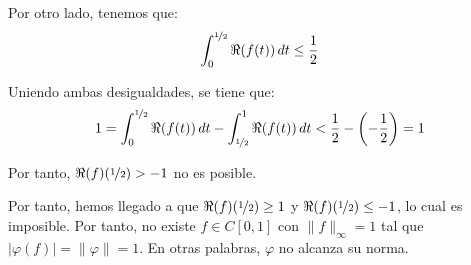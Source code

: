 \documentclass[12pt]{article}
\begin{document}
\begin{ejercicio}
\begin{description}
\begin{itemize}
                Por otro lado, tenemos que:
                \begin{equation*}
                    \int_0^{\nicefrac{1}{2}} \Re(f(t))\,dt \leq \frac{1}{2}
                \end{equation*}

                Uniendo ambas desigualdades, se tiene que:
                \begin{equation*}
                    1 = \int_0^{\nicefrac{1}{2}} \Re(f(t))\,dt - \int_{\nicefrac{1}{2}}^1 \Re(f(t))\,dt < \frac{1}{2} - \left(-\frac{1}{2}\right) = 1
                \end{equation*}

                Por tanto, $\Re(f)(\nicefrac{1}{2}) > -1$ no es posible.
            \end{itemize}

            Por tanto, hemos llegado a que $\Re(f)(\nicefrac{1}{2})\geq 1$ y $\Re(f)(\nicefrac{1}{2})\leq -1$, lo cual es imposible. Por tanto, no existe $f \in C[0, 1]$ con $\|f\|_\infty = 1$ tal que $|\varphi(f)| = \|\varphi\| = 1$. En otras palabras, $\varphi$ no alcanza su norma.
        \end{description}
    \end{ejercicio}
\end{document}
